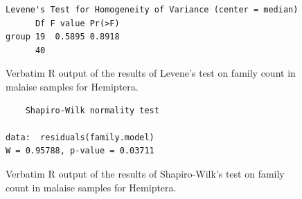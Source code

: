 \documentclass[10pt,letterpaper,twocolumn]{article}
\begin{document}
\begin{figure}[h]
	\lstset{numbers=left}
	\lstset{xleftmargin=5mm,framexleftmargin=5mm}
	\begin{lstlisting}
Levene's Test for Homogeneity of Variance (center = median)
      Df F value Pr(>F)
group 19  0.5895 0.8918
      40               
	\end{lstlisting}
	\caption{Verbatim R output of the results of Levene's test on family count in malaise samples for Hemiptera.}
	\label{fig:malaise_hemiptera_family_levene}
	\smallskip
	\nointerlineskip
	\hrulefill
\end{figure}

\begin{figure}[h]
	\lstset{numbers=left}
	\lstset{xleftmargin=5mm,framexleftmargin=5mm}
	\begin{lstlisting}
	Shapiro-Wilk normality test

data:  residuals(family.model)
W = 0.95788, p-value = 0.03711
	\end{lstlisting}
	\caption{Verbatim R output of the results of Shapiro-Wilk's test on family count in malaise samples for Hemiptera.}
	\label{fig:malaise_hemiptera_family_shapiro}
	\smallskip
	\nointerlineskip
	\hrulefill
\end{figure}
\end{document}
